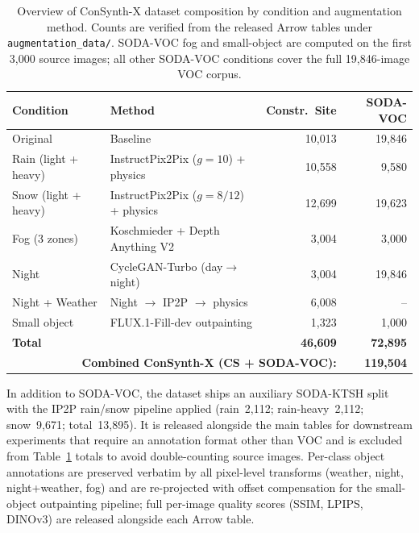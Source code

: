 \documentclass[12pt]{article}
\begin{document}
\begin{table}[H]
\centering
\caption{Overview of ConSynth-X dataset composition by condition and augmentation method. Counts are verified from the released Arrow tables under \texttt{augmentation\_data/}. SODA-VOC fog and small-object are computed on the first 3{,}000 source images; all other SODA-VOC conditions cover the full 19{,}846-image VOC corpus.}
\label{tab:dataset-overview}
\setlength{\tabcolsep}{5pt}
\begin{tabular}{llrr}
\toprule
\textbf{Condition} & \textbf{Method} & \textbf{Constr.\ Site} & \textbf{SODA-VOC} \\
\midrule
Original                 & Baseline                                  & 10,013 & 19,846 \\
Rain (light + heavy)     & InstructPix2Pix ($g{=}10$) + physics      & 10,558 & 9,580  \\
Snow (light + heavy)     & InstructPix2Pix ($g{=}8/12$) + physics    & 12,699 & 19,623 \\
Fog (3 zones)            & Koschmieder + Depth Anything V2           & 3,004  & 3,000  \\
Night                    & CycleGAN-Turbo (day$\rightarrow$night)    & 3,004  & 19,846 \\
Night + Weather          & Night $\rightarrow$ IP2P $\rightarrow$ physics & 6,008 & --     \\
Small object             & FLUX.1-Fill-dev outpainting               & 1,323  & 1,000  \\
\midrule
\textbf{Total}           &                                           & \textbf{46,609}                          & \textbf{72,895} \\
\midrule
\multicolumn{3}{r}{\textbf{Combined ConSynth-X (CS + SODA-VOC):}} & \textbf{119,504} \\
\bottomrule
\end{tabular}
\end{table}

In addition to SODA-VOC, the dataset ships an auxiliary SODA-KTSH split with the IP2P rain/snow pipeline applied (rain~2{,}112; rain-heavy~2{,}112; snow~9{,}671; total~13{,}895). It is released alongside the main tables for downstream experiments that require an annotation format other than VOC and is excluded from Table~\ref{tab:dataset-overview} totals to avoid double-counting source images. Per-class object annotations are preserved verbatim by all pixel-level transforms (weather, night, night+weather, fog) and are re-projected with offset compensation for the small-object outpainting pipeline; full per-image quality scores (SSIM, LPIPS, DINOv3) are released alongside each Arrow table.
\end{document}

